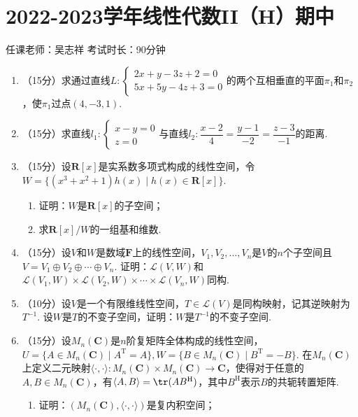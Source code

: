\section{2022-2023学年线性代数II（H）期中}

\begin{center}
    任课老师：吴志祥\hspace{4em} 考试时长：90分钟
\end{center}

\begin{enumerate}
    \item （15分）求通过直线$L\colon\begin{cases}
        2x+y-3z+2=0 \\ 5x+5y-4z+3=0
    \end{cases}$的两个互相垂直的平面$\pi_1$和$\pi_2$，使$\pi_1$过点$(4,-3,1)$.

    \item （15分）求直线$l_1\colon\begin{cases}
        x-y=0 \\ z=0
    \end{cases}$与直线$l_2\colon\dfrac{x-2}{4}=\dfrac{y-1}{-2}=\dfrac{z-3}{-1}$的距离.

    \item （15分）设$\mathbf{R}[x]$是实系数多项式构成的线性空间，令$W=\{(x^3+x^2+1)h(x)\mid h(x)\in\mathbf{R}[x]\}$.
    \begin{enumerate}
        \item 证明：$W$是$\mathbf{R}[x]$的子空间；

        \item 求$\mathbf{R}[x]/W$的一组基和维数.
    \end{enumerate}

    \item （15分）设$V$和$W$是数域$\mathbf{F}$上的线性空间，$V_1,V_2,\ldots,V_n$是$V$的$n$个子空间且$V=V_1\oplus V_2\oplus\cdots\oplus V_n$. 证明：$\mathcal{L}(V,W)$和$\mathcal{L}(V_1,W)\times\mathcal{L}(V_2,W)\times\cdots\times\mathcal{L}(V_n,W)$同构.

    \item （10分）设$V$是一个有限维线性空间，$T\in\mathcal{L}(V)$是同构映射，记其逆映射为$T^{-1}$. 设$W$是$T$的不变子空间，证明：$W$是$T^{-1}$的不变子空间.

    \item （15分）设$M_n(\mathbf{C})$是$n$阶复矩阵全体构成的线性空间，$U=\{A\in M_n(\mathbf{C})\mid A^{\mathrm{T}}=A\},W=\{B\in M_n(\mathbf{C})\mid B^{\mathrm{T}}=-B\}$. 在$M_n(\mathbf{C})$上定义二元映射$\langle\cdot,\cdot\rangle\colon M_n(\mathbf{C})\times M_n(\mathbf{C})\to\mathbf{C}$，使得对于任意的$A,B\in M_n(\mathbf{C})$，有$\langle A,B\rangle=\tr(AB^{\mathrm{H}})$，其中$B^{\mathrm{H}}$表示$B$的共轭转置矩阵.
    \begin{enumerate}
        \item 证明：$(M_n(\mathbf{C}),\langle\cdot,\cdot\rangle)$是复内积空间；


\end{enumerate}
\end{enumerate}
